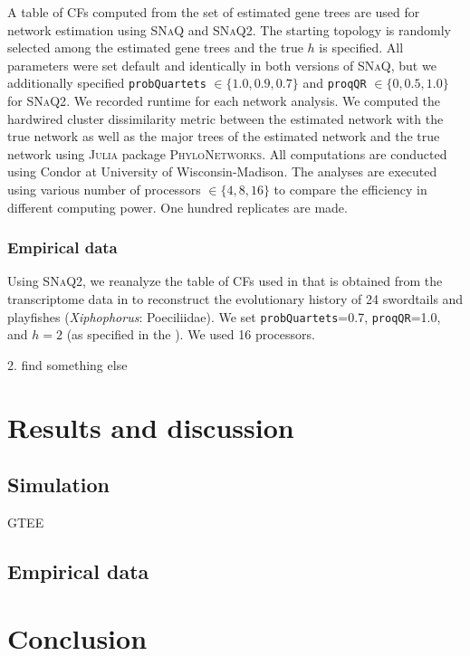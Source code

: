 \documentclass[unnumsec,webpdf,contemporary,large]{oup-authoring-template}%
\theoremstyle{thmstyleone}%
\theoremstyle{thmstyletwo}%
\theoremstyle{thmstylethree}%
\begin{document}
A table of CFs computed from the set of estimated gene trees are used for network estimation using \textsc{SNaQ} and \textsc{SNaQ2}. The starting topology is randomly selected among the estimated gene trees and the true $h$ is specified. All parameters were set default and identically in both versions of \textsc{SNaQ}, but we additionally specified \texttt{probQuartets} $\in\{1.0, 0.9, 0.7\}$ and \texttt{proqQR} $\in\{0,0.5,1.0\}$ for \textsc{SNaQ2}. We recorded runtime for each network analysis. We computed the hardwired cluster dissimilarity metric between the estimated network with the true network as well as the major trees of the estimated network and the true network using \textsc{Julia} package \textsc{PhyloNetworks}. All computations are conducted using Condor at University of Wisconsin-Madison. The analyses are executed using various number of processors $\in\{4,8,16\}$ to compare the efficiency in different computing power. One hundred replicates are made.



\subsubsection{Empirical data}
Using \textsc{SNaQ2}, we reanalyze the table of CFs used in \cite{solis-lemus2016} that is obtained from the transcriptome data in \cite{cui2013} to reconstruct the evolutionary history of 24 swordtails and playfishes (\textit{Xiphophorus}: Poeciliidae). We set \texttt{probQuartets}=0.7, \texttt{proqQR}=1.0, and $h=2$ (as specified in the \cite{solis-lemus2016}). We used 16 processors.

2. find something else

\section{Results and discussion}\label{sec3}
\subsection{Simulation}\label{subsec4}
GTEE
\subsection{Empirical data}\label{subsec5}

\section{Conclusion}\label{sec4}
\end{document}
